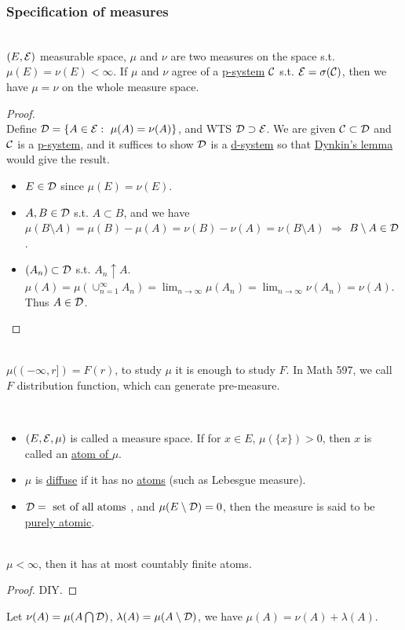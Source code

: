 \vspace{6pt}
\subsubsection{Specification of measures}
\begin{theorem}\label{1.23}\ \\
$(E, \mathcal{E})$ measurable space, $\mu$ and $\nu$ are two measures on the space s.t. $\mu(E) = \nu(E) < \infty$. If $\mu$ and $\nu$ agree of a \underline{p-system} $\mathcal{C}$ s.t. $\mathcal{E} = \sigma(\mathcal{C})$, then we have $\mu = \nu$ on the whole measure space.
\end{theorem}
\begin{proof}\ \\
Define $\mathcal{D} = \{A \in \mathcal{E}:\ \mu(A) = \nu(A)\}$, and WTS $\mathcal{D} \supset \mathcal{E}$. We are given $\mathcal{C} \subset \mathcal{D}$ and $\mathcal{C}$ is a \underline{p-system}, and it suffices to show $\mathcal{D}$ is a \underline{d-system} so that \hyperref[Dynkin's lemma]{Dynkin's lemma} would give the result. 
\begin{itemize}
    \item $E \in \mathcal{D}$ since $\mu(E) = \nu(E)$.
    \item $A,B \in \mathcal{D}$ s.t. $A \subset B$, and we have $\mu(B \setminus A) = \mu(B) - \mu(A) = \nu(B) - \nu(A) = \nu(B\setminus A)$ $\Rightarrow$ $B \setminus A \in \mathcal{D}$.
    \item $(A_n) \subset \mathcal{D}$ s.t. $A_n \uparrow A$. $\mu(A) = \mu(\cup_{n = 1}^\infty A_n) = \lim_{n \to \infty} \mu(A_n) = \lim_{n \to \infty} \nu(A_n) = \nu(A)$. Thus $A \in \mathcal{D}$.
\end{itemize}
\end{proof}
\begin{remark}\ \\
$\mu((-\infty,r]) = F(r)$, to study $\mu$ it is enough to study $F$. In Math 597, we call $F$ distribution function, which can generate pre-measure.
\end{remark}
\begin{remark}[Notation]\ 
\begin{itemize}
    \item $(E,\mathcal{E},\mu)$ is called a measure space. If for $x \in E$, $\mu(\{x\}) > 0$, then $x$ is called an \underline{atom of $\mu$}.
    \item $\mu$ is \underline{diffuse} if it has no \underline{atoms} (such as Lebesgue measure).
    \item $\mathcal{D} = \text{ set of all atoms }$, and $\mu(E \setminus \mathcal{D}) = 0$, then the measure is said to be \underline{purely atomic}.   
\end{itemize}
\begin{lemma}\ \\
$\mu < \infty$, then it has at most countably finite atoms.
\end{lemma}
\begin{proof}
DIY.
\end{proof}
Let $\nu(A) = \mu(A \bigcap \mathcal{D})$, $\lambda(A) = \mu(A \setminus \mathcal{D})$, we have $\mu(A) = \nu(A) + \lambda(A)$.
\end{remark}


